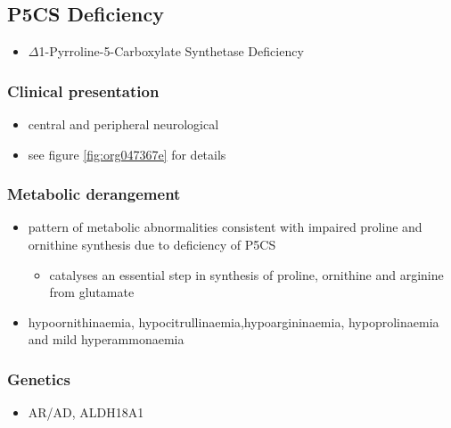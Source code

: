 \documentclass{scrartcl}
\begin{document}
\subsection{P5CS  Deficiency}
\label{sec:org1d83668}
\begin{itemize}
\item \(\Delta\)1-Pyrroline-5-Carboxylate Synthetase Deficiency
\end{itemize}

\subsubsection{Clinical presentation}
\label{sec:orge9b91ea}
\begin{itemize}
\item central and peripheral neurological
\item see figure \ref{fig:org047367e} for details
\end{itemize}

\subsubsection{Metabolic derangement}
\label{sec:org7dfb847}
\begin{itemize}
\item pattern of metabolic abnormalities consistent with impaired proline
and ornithine synthesis due to deficiency of P5CS
\begin{itemize}
\item catalyses an essential step in synthesis of proline, ornithine and
arginine from glutamate
\end{itemize}
\item hypoornithinaemia, hypocitrullinaemia,hypoargininaemia,
hypoprolinaemia and mild hyperammonaemia
\end{itemize}

\subsubsection{Genetics}
\label{sec:org38f0015}
\begin{itemize}
\item AR/AD, ALDH18A1
\end{itemize}
\end{document}
